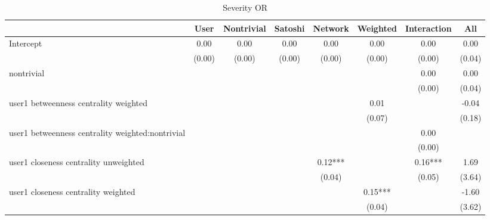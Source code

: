 \begin{table*}
\centering
\caption{Severity OR}
\begin{center}
\begin{tabular}{lccccccc}
\hline
                                                 & User    & Nontrivial & Satoshi & Network & Weighted & Interaction &   All    \\
\hline
\hline

Intercept                                        & 0.00     & 0.00       & 0.00    & 0.00    & 0.00     & 0.00               & 0.00          \\
                                                 & (0.00)   & (0.00)     & (0.00)  & (0.00)  & (0.00)   & (0.00)             & (0.04)        \\
nontrivial                                       &          &            &         &         &          & 0.00               & 0.00          \\
                                                 &          &            &         &         &          & (0.00)             & (0.04)        \\
user1 betweenness centrality weighted            &          &            &         &         & 0.01     &                    & -0.04         \\
                                                 &          &            &         &         & (0.07)   &                    & (0.18)        \\
user1 betweenness centrality weighted:nontrivial &          &            &         &         &          & 0.00               &               \\
                                                 &          &            &         &         &          & (0.00)             &               \\
user1 closeness centrality unweighted            &          &            &         & 0.12*** &          & 0.16***            & 1.69          \\
                                                 &          &            &         & (0.04)  &          & (0.05)             & (3.64)        \\
user1 closeness centrality weighted              &          &            &         &         & 0.15***  &                    & -1.60         \\
                                                 &          &            &         &         & (0.04)   &                    & (3.62)        \\

\end{tabular}
\end{center}
\end{table*}
